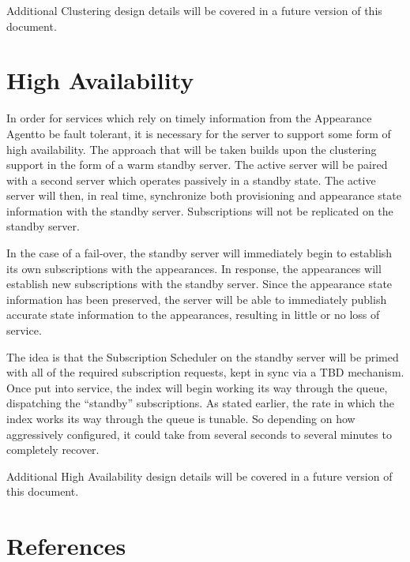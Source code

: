 \documentclass[twoside,11pt]{article}
\newcommand{\bold}[1]{\textbf{#1}}
\newcommand{\gt}[1]{{\color[RGB]{47,139,32}{#1}}}
\newcommand{\PAA}{Appearance Agent\space}
\begin{document}
Additional Clustering design details will be covered in a future version of this document.

\section{High Availability}
In order for services which rely on timely information from the \PAA to be fault tolerant, it is
necessary for the server to support some form of high availability.  The approach that will be taken
builds upon the clustering support in the form of a warm standby server.  The active server will be
paired with a second server which operates passively in a standby state.  The active server will
then, in real time, synchronize both provisioning and appearance state information with the standby
server.  Subscriptions will not be replicated on the standby server.

In the case of a fail-over, the standby server will immediately begin to establish its own
subscriptions with the appearances.  In response, the appearances will establish new subscriptions
with the standby server.  Since the appearance state information has been preserved, the server will
be able to immediately publish accurate state information to the appearances, resulting in little or
no loss of service.

The idea is that the Subscription Scheduler on the standby server will be primed with all of the
required subscription requests, kept in sync via a TBD mechanism. Once put into service, the
\gt{\bold{subscribing}} index will begin working its way through the queue, dispatching the
``standby'' subscriptions.  As stated earlier, the rate in which the \gt{\bold{subscribing}} index
works its way through the queue is tunable.  So depending on how aggressively configured, it could
take from several seconds to several minutes to completely recover.

Additional High Availability design details will be covered in a future version of this document.

\section{References}
\end{document}

